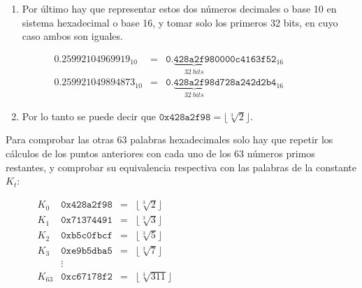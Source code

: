 \documentclass{article}
\begin{document}
\begin{enumerate}
            \item Por último hay que representar estos dos números decimales o base 10 en sistema hexadecimal o base 16, y tomar solo los primeros 32 bits, en cuyo caso ambos son iguales.
                \begin{figure}[H]
                \centering
                    $\begin{array}{lcl}
                    0.25992104969919_{10} & = & \texttt{0.}\underbrace{\texttt{428a2f98}}_{32 \ bits}\texttt{0000c4163f52}_{16} \\
                    0.259921049894873_{10} & = & \texttt{0.}\underbrace{\texttt{428a2f98}}_{32 \ bits}\texttt{d728a242d2b4}_{16}
                    \end{array}$
                \end{figure}
            
            \item Por lo tanto se puede decir que $\texttt{0x428a2f98} = \lfloor \sqrt[3]{2} \rfloor$.
            \vspace{3mm}
        \end{enumerate}
        
        Para comprobar las otras 63 palabras hexadecimales solo hay que repetir los cálculos de los puntos anteriores con cada uno de los 63 números primos restantes, y comprobar su equivalencia respectiva con las palabras de la constante $K_{t}$:
            \begin{figure}[H]
            \centering
                $\begin{array}{lccl}
                    K_{0} & \texttt{0x428a2f98} & = & \lfloor \sqrt[3]{2} \rfloor \\
                        K_{1} & \texttt{0x71374491} & = & \lfloor \sqrt[3]{3} \rfloor \\
                    K_{2} & \texttt{0xb5c0fbcf} & = & \lfloor \sqrt[3]{5} \rfloor \\
                    K_{3} & \texttt{0xe9b5dba5} & = & \lfloor \sqrt[3]{7} \rfloor \\
                    & \vdots & \\
                    K_{63} & \texttt{0xc67178f2} & = & \lfloor \sqrt[3]{311} \rfloor
                \end{array}$
            \end{figure}
\end{document}
